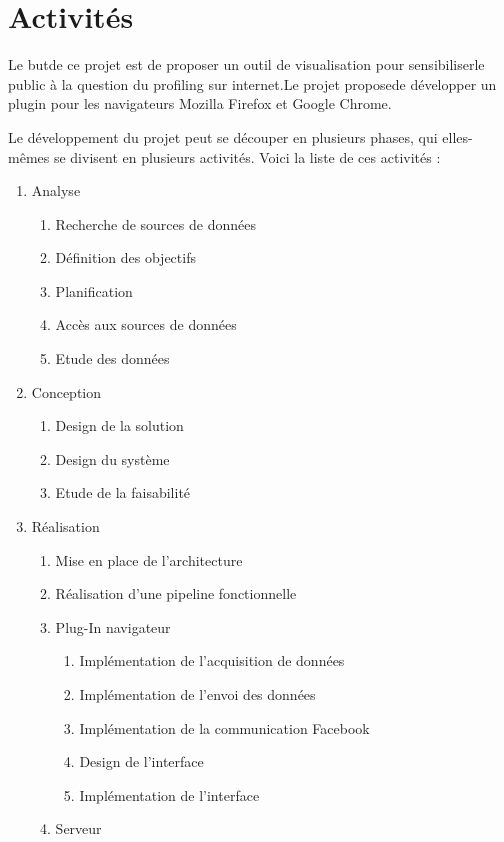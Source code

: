 \section{Activités}

Le butde ce projet est de proposer un outil de visualisation pour sensibiliserle public à la question du profiling sur internet.Le projet proposede développer un plugin pour les navigateurs Mozilla Firefox et Google Chrome.

Le développement du projet peut se découper en plusieurs phases, qui elles-mêmes se divisent en plusieurs activités. Voici la liste de ces activités :

\begin{enumerate}
	\item Analyse
	\begin{enumerate}
		\item Recherche de sources de données
		\item Définition des objectifs
		\item Planification
		\item Accès aux sources de données
		\item Etude des données
	\end{enumerate}
	\item Conception
	\begin{enumerate}
		\item Design de la solution
		\item Design du système
		\item Etude de la faisabilité
	\end{enumerate}
	\item Réalisation
	\begin{enumerate}
		\item Mise en place de l'architecture
		\item Réalisation d'une pipeline fonctionnelle
		\item Plug-In navigateur
		\begin{enumerate}
			\item Implémentation de l'acquisition de données
			\item Implémentation de l'envoi des données
			\item Implémentation de la communication Facebook
			\item Design de l'interface
			\item Implémentation de l'interface
		\end{enumerate}
		\item Serveur
		\begin{enumerate}

\end{enumerate}
\end{enumerate}
\end{enumerate}
